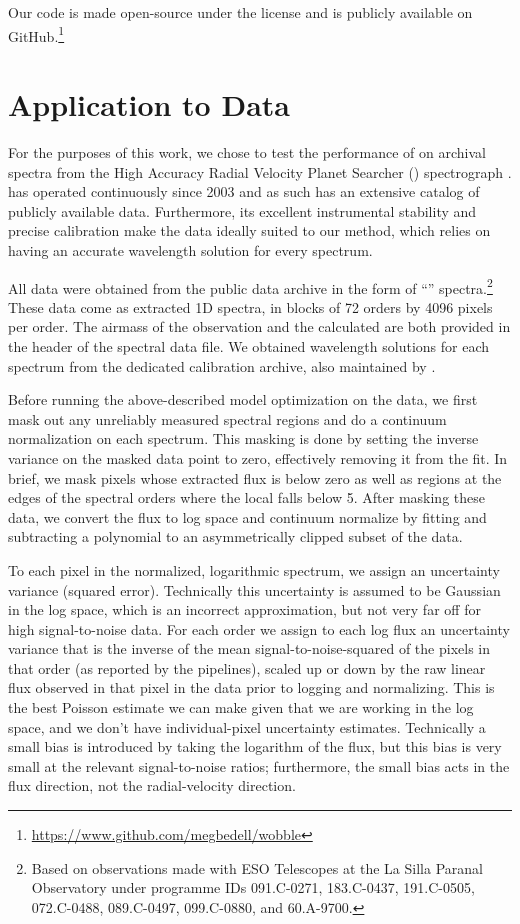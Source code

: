 \documentclass[modern]{aastex62}
\begin{document}
Our code is made open-source under the  license and is publicly available on GitHub.\footnote{\url{https://www.github.com/megbedell/wobble}}



\section{Application to \HARPS Data}
\label{s:results}

For the purposes of this work, we chose to test the performance of \wobble on archival spectra from the High Accuracy Radial Velocity Planet Searcher (\HARPS) spectrograph \citep{Mayor2003}. 
\HARPS has operated continuously since 2003 and as such has an extensive catalog of publicly available data. 
Furthermore, its excellent instrumental stability and precise calibration make the data ideally suited to our method, which relies on having an accurate wavelength solution for every spectrum. 

All data were obtained from the  public data archive in the form of ``'' spectra.\footnote{Based on observations made with ESO Telescopes at the La Silla Paranal Observatory under programme IDs 091.C-0271, 183.C-0437, 191.C-0505, 072.C-0488, 089.C-0497, 099.C-0880, and 60.A-9700.} 
These data come as extracted 1D spectra, in blocks of 72 orders by 4096 pixels per order.
The airmass of the observation and the calculated \BERV are both provided in the  header of the spectral data file. 
We obtained wavelength solutions for each spectrum from the dedicated \HARPS calibration archive, also maintained by .

Before running the above-described model optimization on the data, we first mask out any unreliably measured spectral regions and do a continuum normalization on each spectrum. 
This masking is done by setting the inverse variance on the masked data point to zero, effectively removing it from the fit. 
In brief, we mask pixels whose extracted flux is below zero as well as regions at the edges of the spectral orders where the local \SNR falls below 5. 
After masking these data, we convert the flux to log space and continuum normalize by fitting and subtracting a polynomial to an asymmetrically clipped subset of the data. 

To each pixel in the normalized, logarithmic spectrum, we assign an uncertainty variance (squared error).
Technically this uncertainty is assumed to be Gaussian in the log space, which is an incorrect approximation, but not very far off for high signal-to-noise data. 
For each order we assign to each log flux an uncertainty variance that is the inverse of the mean signal-to-noise-squared of the pixels in that order (as reported by the \HARPS pipelines), scaled up or down by the raw linear flux observed in that pixel in the data prior to logging and normalizing. 
This is the best Poisson estimate we can make given that we are working in the log space, and we don't have individual-pixel uncertainty estimates. 
Technically a small bias is introduced by taking the logarithm of the flux, but this bias is very small at the relevant signal-to-noise ratios; furthermore, the small bias acts in the flux direction, not the radial-velocity direction.
\end{document}
